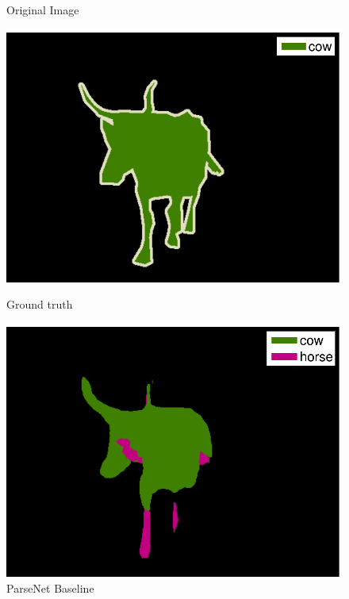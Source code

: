 \documentclass{article} %
\begin{document}
\begin{figure}
\begin{subtable}[b]{0.24\linewidth}
		\caption{Original Image}
	\end{subtable}
	\begin{subtable}[b]{0.24\linewidth}
		\includegraphics[width=\linewidth]{figure/2008_006528_gt-eps-converted-to.pdf}
		\caption{Ground truth}
	\end{subtable}
	\begin{subtable}[b]{0.24\linewidth}
		\includegraphics[width=\linewidth]{figure/2008_006528_base-eps-converted-to.pdf}
		\caption{ParseNet Baseline}
	\end{subtable}
	\begin{subtable}[b]{0.24\linewidth}

\end{subtable}
\end{figure}
\end{document}
